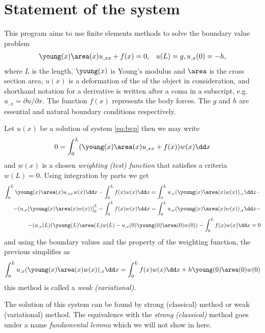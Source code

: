 \documentclass[twoside,a4paper,12pt]{article}
\newcommand{\+}[2]{\newcommand#1{{\color{\notcolor}#2}}}
\newcommand{\1}[2]{\newcommand{#1}[1]{{\color{\notcolor}#2}}}
\newcommand{\2}[2]{\newcommand{#1}[2]{{\color{\notcolor}#2}}}
\begin{document}
\section{Statement of the system}

This program aims to use finite elements methods to solve the boundary
value problem
%
\begin{align}
  \young(x) \area(x) u_{,xx} + f(x) = 0, \label{eq:bvp}
  &&u(L) = g, u_{,x}(0) = -h,
\end{align}
where $L$ is the length, $\young(x)$ is Young's modulus and $\area$ is
the cross section area, $u(x)$ is a deformation of the of the object
in consideration, and shorthand notation for a derivative is written
after a coma in a subscript, e.g. $u_{,x} = \partial u /\partial x$.  The
function $f(x)$ represents the body forces. The $g$ and $h$ are
essential and natural boundary conditions respectively.

Let $u(x)$ be a solution of system \eqref{eq:bvp} then we may write
%
\begin{align}
  0 = \int_0^L (\young(x) \area(x) u_{,xx} + f(x)) w(x) \dd x 
\end{align}
and $w(x)$ is a chosen \emph{weighting (test) function} that satisfies a
criteria $w(L)=0$.
%
Using integration by parts we get
%
\begin{align}
  \int_0^L \young(x) \area(x) u_{,xx} w(x) \dd x 
  -\int_0^L f(x) w(x) \dd x  =
   \int_0^L u_{,x} (\young(x) \area(x) w(x))_{,x} \dd x -\nonumber \\ -
  (u_{,x} (\young(x) \area(x)  w(x))\big|_0^L -
  \int_0^L f(x) w(x) \dd x =  
  \int_0^L u_{,x} (\young(x) \area(x) w(x))_{,x} \dd x -\nonumber \\ -
  (u_{,x}(L) (\young(L) \area(L)  w(L) -
  u_{,x}(0) \young(0) \area(0)  w(0)) 
  -\int_0^L f(x) w(x) \dd x = 0
\end{align}
%
and using the boundary values and the property of the weighting
function, the previous simplifies as
%
\begin{align}
  \int_0^L u_{,x} (\young(x) \area(x) w(x))_{,x} \dd x =  
  \int_0^L f(x) w(x) \dd x + h \young(0) \area(0)  w(0)
  \label{eq:weak-exact}
\end{align}
%
this method is called a \emph{weak (variational)}.

The solution of this system can be found by strong (classical) method
or weak (variational) method. The equivalence with the \emph{strong
  (classical)} method goes under a name \emph{fundamental lemma} which we will not show in here.
\end{document}
